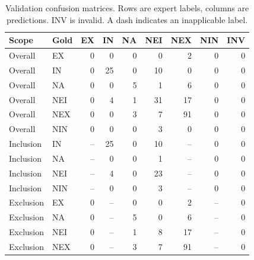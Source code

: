 \begin{table}[t]
\centering\caption{Validation confusion matrices. Rows are expert labels, columns are predictions. INV is invalid. A dash indicates an inapplicable label.}\label{tab:confusion}
\setlength{\tabcolsep}{4pt}
\begin{tabular}{llrrrrrrr}
\toprule
Scope & Gold & EX & IN & NA & NEI & NEX & NIN & INV\\\midrule
Overall & EX & 0 & 0 & 0 & 0 & 2 & 0 & 0\\
Overall & IN & 0 & 25 & 0 & 10 & 0 & 0 & 0\\
Overall & NA & 0 & 0 & 5 & 1 & 6 & 0 & 0\\
Overall & NEI & 0 & 4 & 1 & 31 & 17 & 0 & 0\\
Overall & NEX & 0 & 0 & 3 & 7 & 91 & 0 & 0\\
Overall & NIN & 0 & 0 & 0 & 3 & 0 & 0 & 0\\
Inclusion & IN & -- & 25 & 0 & 10 & -- & 0 & 0\\
Inclusion & NA & -- & 0 & 0 & 1 & -- & 0 & 0\\
Inclusion & NEI & -- & 4 & 0 & 23 & -- & 0 & 0\\
Inclusion & NIN & -- & 0 & 0 & 3 & -- & 0 & 0\\
Exclusion & EX & 0 & -- & 0 & 0 & 2 & -- & 0\\
Exclusion & NA & 0 & -- & 5 & 0 & 6 & -- & 0\\
Exclusion & NEI & 0 & -- & 1 & 8 & 17 & -- & 0\\
Exclusion & NEX & 0 & -- & 3 & 7 & 91 & -- & 0\\
\bottomrule
\end{tabular}
\end{table}
